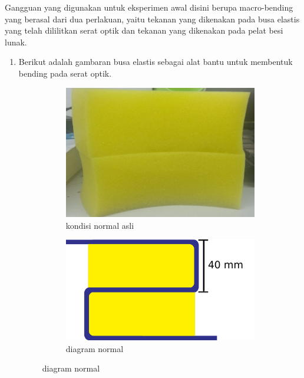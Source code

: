 \documentclass[12pt]{article}
\begin{document}
	Gangguan yang digunakan untuk eksperimen awal disini berupa macro-bending yang berasal dari dua perlakuan, yaitu tekanan yang dikenakan pada busa elastis yang telah dililitkan serat optik dan tekanan yang dikenakan pada pelat besi lunak.
	
	
	\begin{enumerate}
		\item Berikut adalah gambaran busa elastis sebagai alat bantu untuk membentuk bending pada serat optik.
	
			\begin{figure}[h!]
				\centering
				\captionsetup{justification=centering}
				\begin{subfigure}[b]{0.3\textwidth}
					\includegraphics[width=\textwidth]{images/Bab_4/Bab_4_1a}	
					\caption{\small{kondisi normal asli}}		
				\end{subfigure}
				\begin{subfigure}[b]{0.3\textwidth}
					\includegraphics[width=\linewidth]{images/Bab_4/Bab_4_1b}
					\caption{\small{diagram normal}}			

\end{subfigure}
\end{figure}
\end{enumerate}
\end{document}
